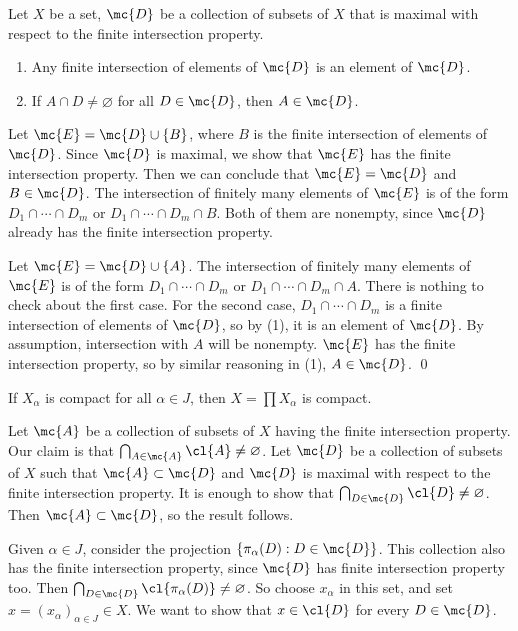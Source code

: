  Let \(X\) be a set, \(\mc{D}\) be a collection of subsets of \(X\) that is maximal with respect to the finite intersection property.
\begin{enumerate}
    \item Any finite intersection of elements of \(\mc{D}\) is an element of \(\mc{D}\).
    \item If \(A \cap D \neq \varnothing\) for all \(D \in \mc{D}\), then \(A \in \mc{D}\).
\end{enumerate}

\pf {} Let \(\mc{E} = \mc{D} \cup \{B\}\), where \(B\) is the finite intersection of elements of \(\mc{D}\). Since \(\mc{D}\) is maximal, we show that \(\mc{E}\) has the finite intersection property. Then we can conclude that \(\mc{E} = \mc{D}\) and \(B \in \mc{D}\). The intersection of finitely many elements of \(\mc{E}\) is of the form \(D_1 \cap \cdots \cap D_m\) or \(D_1 \cap \cdots \cap D_m \cap B\). Both of them are nonempty, since \(\mc{D}\) already has the finite intersection property.

 Let \(\mc{E} = \mc{D} \cup \{A\}\). The intersection of finitely many elements of \(\mc{E}\) is of the form \(D_1 \cap \cdots \cap D_m\) or \(D_1 \cap \cdots \cap D_m \cap A\). There is nothing to check about the first case. For the second case, \(D_1\cap \cdots \cap D_m\) is a finite intersection of elements of \(\mc{D}\), so by (1), it is an element of \(\mc{D}\). By assumption, intersection with \(A\) will be nonempty. \(\mc{E}\) has the finite intersection property, so by similar reasoning in (1), \(A \in \mc{D}\). \qed

  If \(X_\alpha\) is compact for all \(\alpha \in J\), then \(X = \prod X_\alpha\) is compact.

\pf Let \(\mc{A}\) be a collection of subsets of \(X\) having the finite intersection property. Our claim is that \(\bigcap_{A \in \mc{A}} \cl{A} \neq \varnothing\). Let \(\mc{D}\) be a collection of subsets of \(X\) such that \(\mc{A} \subset \mc{D}\) and \(\mc{D}\) is maximal with respect to the finite intersection property. It is enough to show that \(\bigcap_{D \in \mc{D}} \cl{D} \neq \varnothing\). Then \(\mc{A} \subset \mc{D}\), so the result follows.

Given \(\alpha \in J\), consider the projection \(\{\pi_\alpha(D) : D \in \mc{D}\} \). This collection also has the finite intersection property, since \(\mc{D}\) has finite intersection property too. Then \(\bigcap_{D \in \mc{D}} \cl{\pi_\alpha(D)} \neq \varnothing\). So choose \(x_\alpha\) in this set, and set \(x = (x_\alpha)_{\alpha \in J} \in X\). We want to show that \(x \in \cl{D}\) for every \(D \in \mc{D}\).

